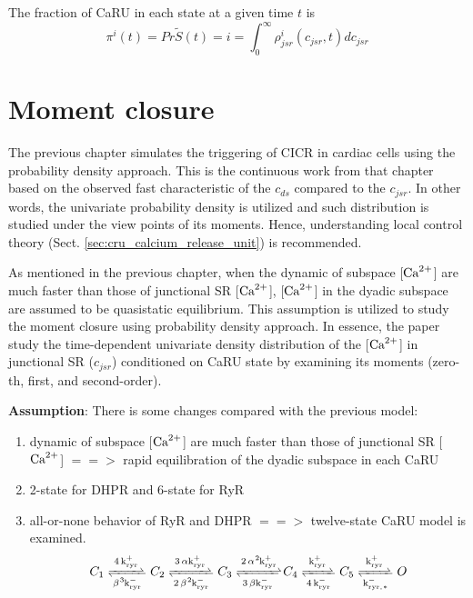 The fraction of CaRU in each state at a given time $t$ is
\begin{equation}
  \label{eq:235}
  \pi^i(t) = Pr{\tilde{S}(t) = i} = \int_0^\infty \rho^i_{jsr}(c_{jsr},t)dc_{jsr}
\end{equation}

\section{Moment closure}
\label{sec:moment-closure}

The previous chapter simulates the triggering of CICR in cardiac cells
using the probability density approach. This is the continuous work
from that chapter\citep{williams2008mclc} based on the observed fast
characteristic of the $c_{ds}$ compared to the $c_{jsr}$. In other
words, the univariate probability density is utilized and such
distribution is studied under the view points of its moments. Hence,
understanding local control theory
(Sect. \ref{sec:cru_calcium_release_unit}) is recommended.


As mentioned in the previous chapter, when the dynamic of subspace
[${\text{Ca}^{2+}}$] are much faster than those of junctional SR [${\text{Ca}^{2+}}$],
[${\text{Ca}^{2+}}$] in the dyadic subspace are assumed to be quasistatic
equilibrium.  This assumption is utilized to study the moment closure
using probability density approach. In essence, the paper study the
time-dependent univariate density distribution of the [${\text{Ca}^{2+}}$] in
junctional SR ($c_{jsr}$) conditioned on CaRU state by examining its
moments (zero-th, first, and second-order).


{\bf Assumption}: There is some changes compared with the previous
model:
\begin{enumerate}
\item dynamic of subspace [${\text{Ca}^{2+}}$] are much faster than those of
  junctional SR [${\text{Ca}^{2+}}$] $==>$ rapid equilibration of the dyadic
  subspace in each CaRU
\item 2-state for DHPR and 6-state for RyR

\item all-or-none behavior of RyR and DHPR  $==>$ twelve-state CaRU
  model is examined.
  \begin{equation}
    \label{eq:201}
    C_1  \ce{<=>[4k^+_{ryr}][\beta^3k^-_{ryr}]} C_2
    \ce{<=>[3\alpha k^+_{ryr}][2\beta^2k^-_{ryr}]} C_3
    \ce{<=>[2\alpha^2k^+_{ryr}][3\beta k^-_{ryr}]} C_4
    \ce{<=>[k^+_{ryr}][4k^-_{ryr}]} C_5
    \ce{<=>[k^+_{ryr}][k^-_{ryr,*}]} O
  \end{equation}
\end{enumerate}



